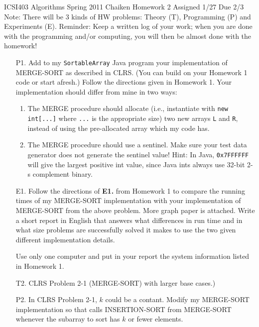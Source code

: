 \documentclass{article}
\begin{document}
\begin{center}
ICSI403 Algorithms Spring 2011 Chaiken\hfill
Homework 2\hfill
Assigned 1/27\hfill
Due 2/3\\
Note: There will be 3 kinds of HW problems: Theory (T), Programming (P) and
Experiments (E).  Reminder: Keep a written log of your work; when you are 
done with the programming and/or computing, you will then be almost 
done with the homework!
\end{center}

\begin{itemize}

\item[P1.] Add to my \texttt{SortableArray} Java program your implementation
of MERGE-SORT as described in CLRS.  (You can build on your Homework 1 code 
or start afresh.) Follow the directions given in
Homework 1.  Your implementation should differ from mine in two ways:
\begin{enumerate}
\item The MERGE procedure should allocate (i.e., instantiate with 
\verb|new int[...]| where \verb|...| is the appropriate size) two new
arrays \texttt{L} and \texttt{R}, instead of using the pre-allocated
array which my code has.

\item The MERGE procedure should use a sentinel.  Make sure your test data
generator does not generate the sentinel value! Hint: In Java,
\texttt{0x7FFFFFF} will give the largest positive int value, since Java ints
always use 32-bit 2-s complement binary.  
 
\end{enumerate}

\item[E1.] Follow the directions of \textbf{E1.} from Homework 1 to compare
the running times of my MERGE-SORT implementation with your implementation
of MERGE-SORT from the above problem.  More graph paper is attached.
Write a short report in English that answers what differences in run
time and in what size problems are successfully solved it makes to
use the two given different implementation details.  

Use only one computer and put in your report the system 
information listed in Homework 1.

\item[T2.] CLRS Problem 2-1 (MERGE-SORT) with larger base cases.)

\item[P2.] In CLRS Problem 2-1, $k$ could be a contant.  Modify my
MERGE-SORT implementation so that calls INSERTION-SORT from
MERGE-SORT whenever the subarray to sort has $k$ or fewer elements.



\end{itemize}
\end{document}
